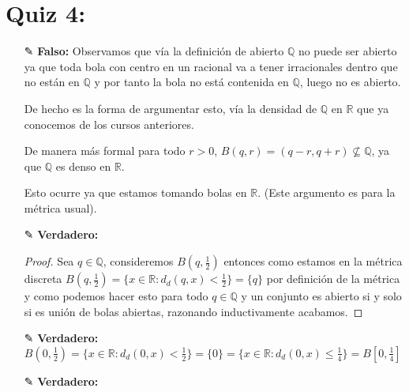 \section{Quiz 4:}

\begin{itemize}[leftmargin=*]
\item[✎] \textbf{Falso: }Observamos que vía la definición de abierto $\mathbb{Q}$ no puede ser abierto ya que toda bola con centro en un racional va a tener irracionales dentro que no están en $\mathbb{Q}$ y por tanto la bola no está contenida en $\mathbb{Q}$, luego no es abierto.

De hecho es la forma de argumentar esto, vía la densidad de $\mathbb{Q}$ en $\mathbb{R}$ que ya conocemos de los cursos anteriores.

De manera más formal para todo $r>0$, $B(q,r)=(q-r,q+r) \not \subseteq \mathbb{Q}$, ya que $\mathbb{Q}$ es denso en $\mathbb{R}$.

Esto ocurre ya que estamos tomando bolas en $\mathbb{R}$. (Este argumento es para la métrica usual).

\item[✎] \textbf{Verdadero: } \\
\begin{proof}
    Sea $q \in \mathbb{Q}$, consideremos $B(q,\frac{1}{2})$ entonces como estamos en la métrica discreta $B(q,\frac{1}{2})=\{x\in \mathbb{R}:d_d(q,x)<\frac{1}{2}\}=\{q\}$ por definición de la métrica y como podemos hacer esto para todo $q\in \mathbb{Q}$ y un conjunto es abierto si y solo si es unión de bolas abiertas, razonando inductivamente acabamos.
\end{proof}


\item[✎] \textbf{Verdadero: }$B(0,\frac{1}{2})=\{x\in \mathbb{R} : d_d(0,x)<\frac{1}{2}\}=\{0\}=\{x \in \mathbb{R} : d_d(0,x)\leq \frac{1}{4}\}=B[0,\frac{1}{4}]$

\item[✎]\textbf{Verdadero: }\\

\begin{basedtikz}
\end{basedtikz}
\end{itemize}
